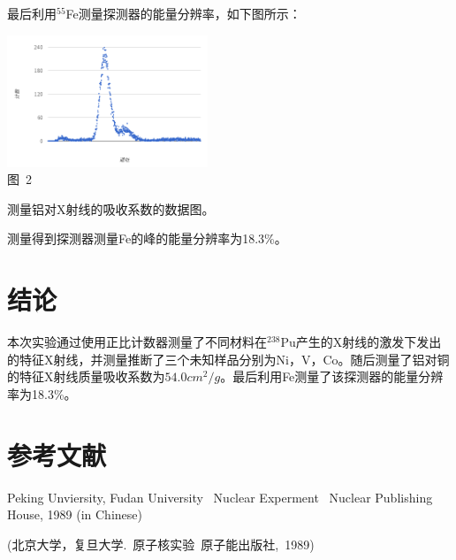 \documentclass[a4paper,10.0pt,twoside]{npr}
\begin{document}
\begin{multicols}{2}
最后利用$^{55}$Fe测量探测器的能量分辨率，如下图所示：
\begin{center}
   \includegraphics[width=0.45\textwidth]{3.png}
\\
\xiaowu\song 图~2\begin{minipage}[t]{75mm} \quad 测量铝对X射线的吸收系数的数据图。\\[-1mm]\wuhao
\end{minipage}
\end{center}
测量得到探测器测量Fe的峰的能量分辨率为18.3\%。

\section{结论}

本次实验通过使用正比计数器测量了不同材料在$^{238}$Pu产生的X射线的激发下发出的特征X射线，并测量推断了三个未知样品分别为Ni，V，Co。随后测量了铝对铜的特征X射线质量吸收系数为$54.0 cm^2/g$。最后利用Fe测量了该探测器的能量分辨率为18.3\%。

\section{参考文献}

\noindent
[1] Peking Unviersity, Fudan University \ Nuclear Experment
\ Nuclear Publishing House, 1989 (in Chinese)

\noindent
 (北京大学，复旦大学.\ 原子核实验\ 原子能出版社,\ 1989)

\end{multicols}

\newpage




\clearpage
\end{document}
